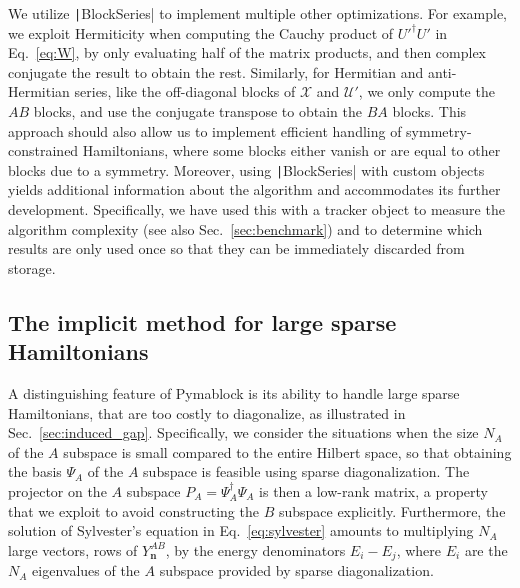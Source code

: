 We utilize \texttt|BlockSeries| to implement multiple other optimizations.
For example, we exploit Hermiticity when computing the Cauchy product of $U'^{\dagger}U'$ in Eq.~\eqref{eq:W}, by only evaluating half of the matrix products, and then complex conjugate the result to obtain the rest.
Similarly, for Hermitian and anti-Hermitian series, like the off-diagonal blocks of $\mathcal{X}$ and $\mathcal{U}'$, we only compute the $AB$ blocks, and use the conjugate transpose to obtain the $BA$ blocks.
This approach should also allow us to implement efficient handling of symmetry-constrained Hamiltonians, where some blocks either vanish or are equal to other blocks due to a symmetry.
Moreover, using \texttt|BlockSeries| with custom objects yields additional information about the algorithm and accommodates its further development.
Specifically, we have used this with a tracker object to measure the algorithm complexity (see also Sec.~\ref{sec:benchmark}) and to determine which results are only used once so that they can be immediately discarded from storage.

\subsection{The implicit method for large sparse Hamiltonians}
\label{sec:implicit}

A distinguishing feature of Pymablock is its ability to handle large sparse Hamiltonians, that are too costly to diagonalize, as illustrated in Sec.~\ref{sec:induced_gap}.
Specifically, we consider the situations when the size $N_A$ of the $A$ subspace is small compared to the entire Hilbert space, so that obtaining the basis $\Psi_A$ of the $A$ subspace is feasible using sparse diagonalization.
The projector on the $A$ subspace $P_A = \Psi_A^\dagger \Psi_A$ is then a low-rank matrix, a property that we exploit to avoid constructing the $B$ subspace explicitly.
Furthermore, the solution of Sylvester's equation in Eq.~\ref{eq:sylvester} amounts to multiplying $N_A$ large vectors, rows of $Y_{\mathbf{n}}^{AB}$, by the energy denominators $E_i - E_j$, where $E_i$ are the $N_A$ eigenvalues of the $A$ subspace provided by sparse diagonalization.

